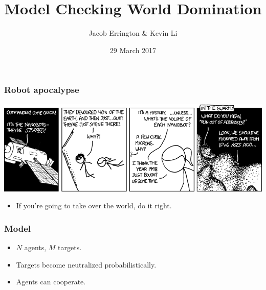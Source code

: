 \documentclass{beamer}
\title{Model Checking World Domination}
\author{Jacob Errington \& Kevin Li}
\institute{McGill University}
\date{29 March 2017}
\begin{document}
\frame{\titlepage}

\begin{frame}
    \frametitle{Robot apocalypse}

    \includegraphics[width=\textwidth]{nanobots.png}

    \pause

    \begin{itemize}
        \item
            If you're going to take over the world, \alert{do it right.}
    \end{itemize}
\end{frame}

\begin{frame}
    \frametitle{Model}

    \begin{itemize}
        \item
            $N$ agents, $M$ targets.
        \item
            Targets become neutralized probabilistically.
        \item
            Agents can cooperate.
    \end{itemize}

    \begin{center}
    \end{center}
\end{frame}
\end{document}
